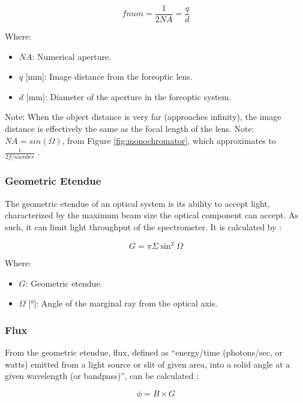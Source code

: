 \documentclass{article}
\begin{document}
\begin{equation} \label{eq:f-num}
    fnum = \frac{1}{2NA} = \frac{q}{d}
\end{equation}

Where:
\begin{itemize}[label={}]
    \item $NA$: Numerical aperture.
    \item $q$ [\si{\mm}]: Image distance from the foreoptic lens.
    \item $d$ [\si{\mm}]: Diameter of the aperture in the foreoptic system.
\end{itemize}
Note: When the object distance is very far (approaches infinity), the image distance is effectively the same as the focal length of the lens.
Note: $NA = sin(\Omega)$, from Figure \ref{fig:monochromator}, which approximates to $\frac{1}{2f/number}$ \cite{Horiba_monochromator}.

\subsubsection{Geometric Etendue}
The geometric etendue of an optical system is its ability to accept light, characterized by the maximum beam size the optical component can accept. As such, it can limit light throughput of the spectrometer. It is calculated by \cite{Horiba_throughput_etendue}:

\begin{equation} \label{eq:geometric-etendue}
    G = \pi\Sigma\sin^2\Omega
\end{equation}

Where:
\begin{itemize}[label={}]
    \item $G$: Geometric etendue.
    \item $\Omega$ [\si{\degree}]: Angle of the marginal ray from the optical axis.
\end{itemize}

\subsubsection{Flux}
From the geometric etendue, flux, defined as “energy/time (photons/sec, or watts) emitted from a light source or slit of given area, into a solid angle at a given wavelength (or bandpass)”, can be calculated \cite{Horiba_throughput_etendue}:

\begin{equation} \label{eq:flux}
    \phi = B\times G
\end{equation}
\end{document}
